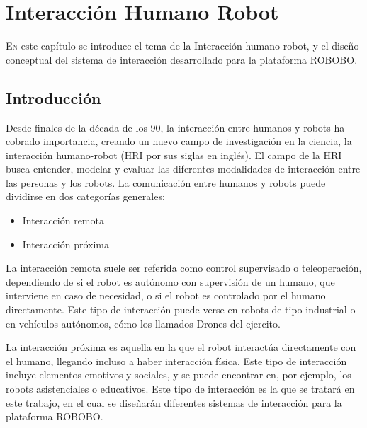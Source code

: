 \chapter{Interacción Humano Robot}
\label{chap:interaccion-humano-robot}





\lettrine{E}{n} este capítulo se introduce el tema de la Interacción humano robot, 	y el diseño conceptual del sistema de interacción desarrollado para la plataforma ROBOBO.

\section{Introducción}
 \label{sec:hri-intro}
 
 Desde finales de la década de los 90, la interacción entre humanos y robots ha cobrado importancia, creando un nuevo campo de investigación en la ciencia\cite{goodrich2007human}, la interacción humano-robot (HRI por sus siglas en inglés). El campo de la HRI busca entender, modelar y evaluar las diferentes modalidades de interacción entre las personas y los robots. La comunicación entre humanos y robots puede dividirse  en dos categorías generales:
 \begin{itemize}
 	\item Interacción remota
 	\item Interacción próxima
 \end{itemize}
 
 La interacción remota suele ser referida como control supervisado o teleoperación, dependiendo de si el robot es autónomo con supervisión de un humano, que interviene en caso de necesidad, o si el robot es controlado por el humano directamente. Este tipo de interacción puede verse en robots de tipo industrial o en vehículos autónomos, cómo los llamados Drones del ejercito.
 
 La interacción próxima es aquella en la que el robot interactúa directamente con el humano, llegando incluso a haber interacción física. Este tipo de interacción incluye elementos emotivos y sociales, y se puede encontrar en, por ejemplo, los robots asistenciales o educativos. Este tipo de interacción es la que se tratará en este trabajo, en el cual se diseñarán diferentes sistemas de interacción para la plataforma ROBOBO.
 
